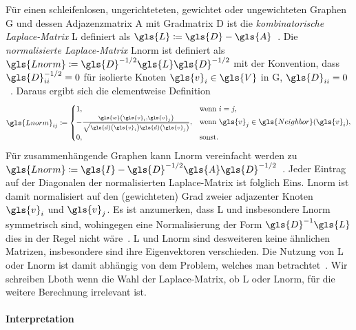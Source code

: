 Für einen schleifenlosen, ungerichteteten, gewichtet oder ungewichteten Graphen \gls{G} und dessen Adjazenzmatrix \gls{A} mit Gradmatrix \gls{D} ist die \emph{kombinatorische Laplace-Matrix} \gls{L} definiert als $\gls{L} \coloneqq \gls{D} - \gls{A}$~\cite{Chung}.
Die \emph{normalisierte Laplace-Matrix} \gls{Lnorm} ist definiert als $\gls{Lnorm} \coloneqq \gls{D}^{-1/2} \gls{L} \gls{D}^{-1/2}$ mit der Konvention, dass $\gls{D}^{-1/2}_{ii} = 0$ für isolierte Knoten $\gls{v}_i \in \gls{V}$ in \gls{G}, \dhe{} $\gls{D}_{ii} = 0$~\cite{Chung}.
Daraus ergibt sich die elementweise Definition
\begin{equation*}
  \gls{Lnorm}_{ij} \coloneqq \begin{cases}
  1, & \text{wenn }i = j,\\
    -\frac{\gls{w}\left(\gls{v}_i, \gls{v}_j\right)}{\sqrt{\gls{d}\left(\gls{v}_i\right)\gls{d}\left(\gls{v}_j\right)}}, & \text{wenn }\gls{v}_j \in \gls{Neighbor}\left(\gls{v}_i\right),\\
  0, & \text{sonst.}
\end{cases}
\end{equation*}
Für zusammenhängende Graphen kann \gls{Lnorm} vereinfacht werden zu $\gls{Lnorm} \coloneqq \gls{I} - \gls{D}^{-1/2} \gls{A} \gls{D}^{-1/2}$~\cite{Chung}.
Jeder Eintrag auf der Diagonalen der normalisierten Laplace-Matrix ist folglich Eins.
\gls{Lnorm} ist damit normalisiert auf den (gewichteten) Grad zweier adjazenter Knoten $\gls{v}_i$ und $\gls{v}_j$.
Es ist anzumerken, dass \gls{L} und insbesondere \gls{Lnorm} symmetrisch sind, wohingegen eine Normalisierung der Form $\gls{D}^{-1}\gls{L}$ dies in der Regel nicht wäre~\cite{Reuter}.
\gls{L} und \gls{Lnorm} sind desweiteren keine ähnlichen Matrizen, insbesondere sind ihre Eigenvektoren verschieden.
Die Nutzung von \gls{L} oder \gls{Lnorm} ist damit abhängig von dem Problem, welches man betrachtet~\cite{Hammond}.
Wir schreiben \gls{Lboth} wenn die Wahl der Laplace-Matrix, ob \gls{L} oder \gls{Lnorm}, für die weitere Berechnung irrelevant ist.

\paragraph{Interpretation}
\label{laplace_interpretation}



